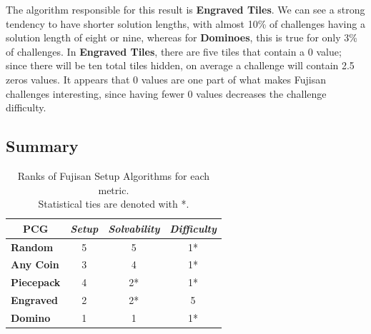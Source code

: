 \documentclass[journal]{IEEEtran}
\begin{document}
The algorithm responsible for this result is {\bf Engraved Tiles}. We can see a strong tendency to have shorter solution lengths, with almost 10\% of challenges having a solution length of eight or nine, whereas for {\bf Dominoes}, this is true for only 3\% of challenges. In {\bf Engraved Tiles}, there are five tiles that contain a 0 value; since there will be ten total tiles hidden, on average a challenge will contain 2.5 zeros values. It appears that 0 values are one part of what makes Fujisan challenges interesting, since having fewer 0 values decreases the challenge difficulty.


\subsection{Summary}
\begin{table}[]
\centering
\renewcommand{\arraystretch}{1.3}
\caption{Ranks of Fujisan Setup Algorithms for each metric.\\ Statistical ties are denoted with *.}
\label{table_example}
\begin{tabular}{l|c|c|c|}
\multicolumn{1}{c|}{\textbf{PCG}} & \multicolumn{1}{l|}{\textit{\textbf{Setup}}} & \multicolumn{1}{l|}{\textit{\textbf{Solvability}}} & \multicolumn{1}{l|}{\textit{\textbf{Difficulty}}} \\ \hline
\textbf{Random}                   & 5                                            & 5                                                  & 1*                                                 \\ \hline
\textbf{Any Coin}                 & 3                                            & 4                                                  & 1*                                                 \\ \hline
\textbf{Piecepack}                & 4                                            & 2*                                                  & 1*                                                 \\ \hline
\textbf{Engraved}                 & 2                                            & 2*                                                  & 5                                                 \\ \hline
\textbf{Domino}                   & 1                                            & 1                                                  & 1*                                                 \\ \hline
\end{tabular}
\end{table}
\end{document}
